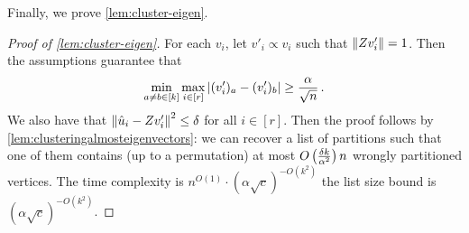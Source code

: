 Finally, we prove \cref{lem:cluster-eigen}.

\begin{proof}[Proof of \cref{lem:cluster-eigen}]

    For each $v_i$, let $v'_i \propto v_i$ such that $\left\lVert Z v'_i\right\rVert = 1$.
    Then the assumptions guarantee that 
    \[\min_{a\neq b\in[k]}\max_{i \in [r]} \left\lvert(v'_i)_a- (v'_i)_b\right\rvert \geq \frac{\alpha}{\sqrt{n}}\,.\]
    We also have that $\left\lVert\hat{u}_i - Z v'_i\right\rVert^2 \leq \delta$ for all $i \in [r]$.
    Then the proof follows by \cref{lem:clusteringalmosteigenvectors}: we can recover a list of partitions such that one of them contains (up to a permutation) at most $O\left(\frac{\delta k}{\alpha^2}\right) n$ wrongly partitioned vertices.
    The time complexity is $n^{O(1)} \cdot (\alpha \sqrt{c})^{-O(k^2)}$ the list size bound is $(\alpha \sqrt{c})^{-O(k^2)}$.
\end{proof}
